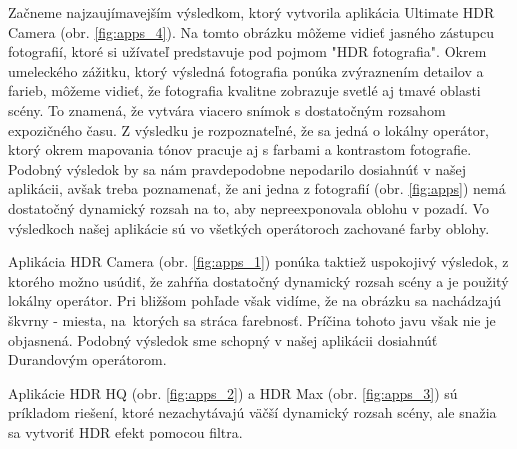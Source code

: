 Začneme najzaujímavejším výsledkom, ktorý vytvorila aplikácia Ultimate HDR Camera (obr. \ref{fig:apps_4}).
Na tomto obrázku môžeme vidieť jasného zástupcu fotografií, ktoré si užívateľ predstavuje pod pojmom
"HDR fotografia". Okrem umeleckého zážitku, ktorý výsledná fotografia ponúka zvýraznením detailov
a farieb, môžeme vidieť, že fotografia kvalitne zobrazuje svetlé aj tmavé oblasti scény. To znamená,
že vytvára viacero snímok s dostatočným rozsahom expozičného času. Z výsledku je rozpoznateľné, že sa jedná
o lokálny operátor, ktorý okrem mapovania tónov pracuje aj s farbami a kontrastom fotografie. Podobný
výsledok by sa nám pravdepodobne nepodarilo dosiahnúť v našej aplikácii, avšak treba poznamenať,
že ani jedna z fotografií (obr. \ref{fig:apps}) nemá dostatočný dynamický rozsah na to, aby nepreexponovala
oblohu v pozadí. Vo výsledkoch našej aplikácie sú vo všetkých operátoroch zachované farby oblohy.

Aplikácia HDR Camera (obr. \ref{fig:apps_1}) ponúka taktiež uspokojivý výsledok, z ktorého možno usúdiť,
že zahŕňa dostatočný dynamický rozsah scény a je použitý lokálny operátor. Pri bližšom pohľade však vidíme,
že na obrázku sa nachádzajú škvrny - miesta, na~ktorých sa stráca farebnosť. Príčina tohoto javu však nie je
objasnená. Podobný výsledok sme schopný v našej aplikácii dosiahnúť Durandovým operátorom.

Aplikácie HDR HQ (obr. \ref{fig:apps_2}) a HDR Max (obr. \ref{fig:apps_3}) sú príkladom riešení, ktoré nezachytávajú
väčší dynamický rozsah scény, ale snažia sa vytvoriť HDR efekt pomocou filtra.
